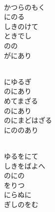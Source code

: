 \documentclass[10pt,b5j]{tarticle} %
\begin{document}
\begin{enumerate}
\begin{minipage}[c]{\blocksize}
        \vspace{\linespace}
        \item~\\
        かつらのもく\\
        にのる\\
        しきのけて\\
        ときでし\\
        のの\\
        がにあり
        
    \end{minipage}
    \begin{minipage}[c]{\blocksize}
        
        \vspace{\linespace}
        \item~\\
        にゆるぎ\\
        のにあり\\
        めてまざる\\
        のにあり\\
        のにまどはざる\\
        にののあり
        
    \end{minipage}
    \begin{minipage}[c]{\blocksize}
        
        \vspace{\linespace}
        \item~\\
        ゆるをにて\\
        しきをばよへ\\
        のにの\\
        をりつ\\
        にらぬに\\
        ぎしのをむ
        

\end{minipage}
\end{enumerate}
\end{document}
